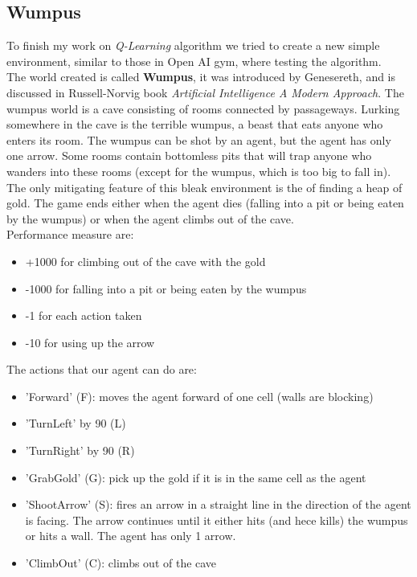 \documentclass[]{report}
\begin{document}
\subsection{Wumpus}
To finish my work on \emph{Q-Learning} algorithm we tried to create a new simple environment, similar to those in Open AI gym, where testing the algorithm.\\
The world created is called \textbf{Wumpus}, it was introduced by Genesereth, and is discussed in Russell-Norvig book \emph{Artificial Intelligence A Modern Approach}.
The wumpus world is a cave consisting of rooms connected by passageways. Lurking somewhere in the cave is the terrible wumpus, a beast that eats anyone who enters its room. The wumpus can be shot by an agent, but the agent has only one arrow. Some rooms contain bottomless pits that will trap anyone who wanders into these rooms (except for the wumpus, which is too big to fall in). The only mitigating feature of this bleak environment is the of finding a heap of gold. The game ends either when the agent dies (falling into a pit or being eaten by the wumpus) or when the agent climbs out of the cave.\\
Performance measure are:
\begin{itemize}
	\item +1000 for climbing out of the cave with the gold
	\item -1000 for falling into a pit or being eaten by the wumpus
	\item -1 for each action taken
	\item -10 for using up the arrow
\end{itemize}

\vspace{7 mm}
The actions that our agent can do are:
\vspace{5 mm}
\begin{itemize}
	\item 'Forward' (F): moves the agent forward of one cell (walls are blocking)
	\item 'TurnLeft' by 90 (L)
	\item 'TurnRight' by 90 (R)
	\item 'GrabGold' (G): pick up the gold if it is in the same cell as the agent
	\item 'ShootArrow' (S): fires an arrow in a straight line in the direction of the agent is facing. The arrow continues until it either hits (and hece kills) the wumpus or hits a wall. The agent has only 1 arrow.
	\item 'ClimbOut' (C): climbs out of the cave	   
\end{itemize}
\end{document}
